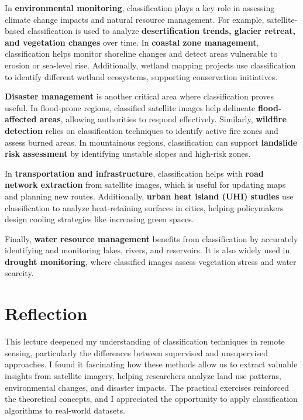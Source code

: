 \documentclass[
  letterpaper,
]{scrbook}
\begin{document}
In \textbf{environmental monitoring}, classification plays a key role in
assessing climate change impacts and natural resource management. For
example, satellite-based classification is used to analyze
\textbf{desertification trends, glacier retreat, and vegetation changes}
over time. In \textbf{coastal zone management}, classification helps
monitor shoreline changes and detect areas vulnerable to erosion or
sea-level rise. Additionally, wetland mapping projects use
classification to identify different wetland ecosystems, supporting
conservation initiatives.

\textbf{Disaster management} is another critical area where
classification proves useful. In flood-prone regions, classified
satellite images help delineate \textbf{flood-affected areas}, allowing
authorities to respond effectively. Similarly, \textbf{wildfire
detection} relies on classification techniques to identify active fire
zones and assess burned areas. In mountainous regions, classification
can support \textbf{landslide risk assessment} by identifying unstable
slopes and high-risk zones.

In \textbf{transportation and infrastructure}, classification helps with
\textbf{road network extraction} from satellite images, which is useful
for updating maps and planning new routes. Additionally, \textbf{urban
heat island (UHI) studies} use classification to analyze heat-retaining
surfaces in cities, helping policymakers design cooling strategies like
increasing green spaces.

Finally, \textbf{water resource management} benefits from classification
by accurately identifying and monitoring lakes, rivers, and reservoirs.
It is also widely used in \textbf{drought monitoring}, where classified
images assess vegetation stress and water scarcity.

\section{Reflection}\label{reflection-4}

This lecture deepened my understanding of classification techniques in
remote sensing, particularly the differences between supervised and
unsupervised approaches. I found it fascinating how these methods allow
us to extract valuable insights from satellite imagery, helping
researchers analyze land use patterns, environmental changes, and
disaster impacts. The practical exercises reinforced the theoretical
concepts, and I appreciated the opportunity to apply classification
algorithms to real-world datasets.
\end{document}

